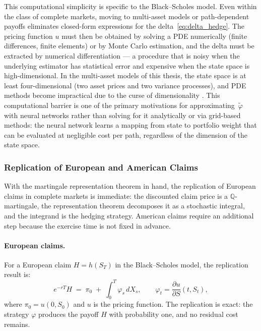 This computational simplicity is specific to the Black--Scholes model.
Even within the class of complete markets, moving to multi-asset models or
path-dependent payoffs eliminates closed-form expressions for the
delta~\eqref{eq:delta_hedge}.  The pricing function $u$ must then be
obtained by solving a PDE numerically (finite differences, finite
elements) or by Monte Carlo estimation, and the delta must be extracted by
numerical differentiation --- a procedure that is noisy when the
underlying estimator has statistical error and expensive when the state
space is high-dimensional.  In the multi-asset models of this thesis, the
state space is at least four-dimensional (two asset prices and two
variance processes), and PDE methods become impractical due to the curse
of dimensionality \citep{Glasserman2003}.  This computational barrier is
one of the primary motivations for approximating~$\tilde{\varphi}$ with
neural networks rather than solving for it analytically or via grid-based
methods: the neural network learns a mapping from state to portfolio
weight that can be evaluated at negligible cost per path, regardless of
the dimension of the state space.


\subsubsection{Replication of European and American Claims}
\label{sssec:replication_claims}

With the martingale representation theorem in hand, the replication of
European claims in complete markets is immediate: the discounted claim
price is a $\mathbb{Q}$-martingale, the representation theorem
decomposes it as a stochastic integral, and the integrand is the hedging
strategy.  American claims require an additional step because the exercise
time is not fixed in advance.

\paragraph{European claims.}
For a European claim $H = h(S_T)$ in the Black--Scholes model, the
replication result is:
\begin{equation}
\label{eq:european_replication}
e^{-rT} H \;=\; \pi_0
\;+\; \int_0^T \varphi_s \, dX_s,
\qquad
\varphi_t = \frac{\partial u}{\partial S}(t, S_t),
\end{equation}
where $\pi_0 = u(0, S_0)$ and $u$ is the pricing function.  The
replication is exact: the strategy $\varphi$ produces the payoff $H$
with probability one, and no residual cost remains.

